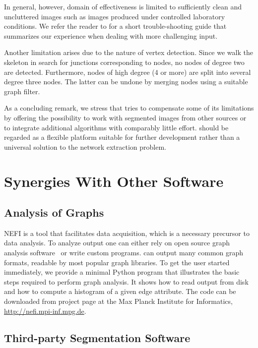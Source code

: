 		In general, however, \NEFIs domain of effectiveness is limited to sufficiently clean and uncluttered images such as images produced under controlled laboratory conditions. We refer the reader to  for a short trouble-shooting guide that summarizes our experience when dealing with more challenging input.

		Another limitation arises due to the nature of \NEFIs vertex detection. Since we walk the skeleton in search for junctions corresponding to nodes, no nodes of degree two are detected. Furthermore, nodes of high degree (4 or more) are split into several degree three nodes. The latter can be undone by merging nodes using a suitable graph filter.

		As a concluding remark, we stress that \NEFI tries to compensate some of its limitations by offering the possibility to work with segmented images from other sources or to integrate additional algorithms with comparably little effort. \NEFI should be regarded as a flexible platform suitable for further development rather than a universal solution to the network extraction problem. 

\section{Synergies With Other Software}

	\subsection{Analysis of Graphs}

		NEFI is a tool that facilitates data acquisition, which is a necessary precursor to data analysis. To analyze \NEFIs output one can either rely on open source graph analysis software~\cite{ICWSM09154,snap,batagelj1998pajek,5437689,loscalzo2008social,hagberg2008exploring} or write custom programs. \NEFI can output many common graph formats, readable by most popular graph libraries. To get the user started immediately, we provide a minimal Python program that illustrates the basic steps required to perform graph analysis. It shows how to read \NEFIs output from disk and how to compute a histogram of a given edge attribute. The code can be downloaded from \NEFIs project page at the Max Planck Institute for Informatics, \href{http://nefi.mpi-inf.mpg.de}{http://nefi.mpi-inf.mpg.de}.

	\subsection{Third-party Segmentation Software}

